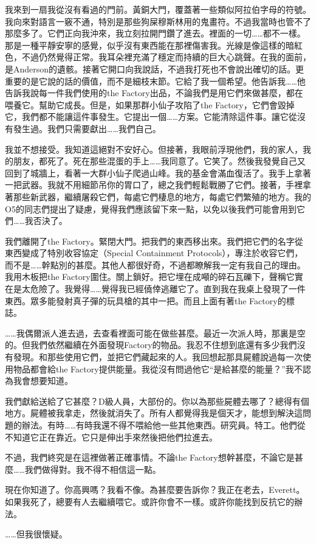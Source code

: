 我來到一扇我從沒有看過的門前。黃銅大門，覆蓋著一些類似阿拉伯字母的符號。我向來對語言一竅不通，特別是那些狗屎穆斯林用的鬼畫符。不過我當時也管不了那麼多了。它們正向我沖來，我立刻拉開門鑽了進去。裡面的一切……都不一樣。那是一種平靜安寧的感覺，似乎沒有東西能在那裡傷害我。光線是像這樣的暗紅色，不過仍然覺得正常。我耳朵裡充滿了穩定而持續的巨大心跳聲。在我的面前，是Anderson的遺骸。接著它開口向我說話，不過我打死也不會說出確切的話。更重要的是它說的話的價值，而不是細枝末節。它給了我一個希望。他告訴我……他告訴我說每一件我們使用的the Factory出品，不論我們是用它們來做甚麼，都在喂養它。幫助它成長。但是，如果那群小仙子攻陷了the Factory，它們會毀掉它，我們都不能讓這件事發生。它提出一個……方案。它能清除這件事。讓它從沒有發生過。我們只需要獻出……我們自己。

我並不想接受。我知道這絕對不安好心。但接著，我眼前浮現他們，我的家人，我的朋友，都死了。死在那些混蛋的手上……我同意了。它笑了。然後我發覺自己又回到了城牆上，看著一大群小仙子爬過山峰。我的基金會滿血復活了。我手上拿著一把武器。我就不用細節吊你的胃口了，總之我們輕鬆戰勝了它們。接著，手裡拿著那些新武器，繼續屠殺它們，每處它們棲息的地方，每處它們繁殖的地方。我的O5的同志們提出了疑慮，覺得我們應該留下來一點，以免以後我們可能會用到它們……我否決了。

我們離開了the Factory。緊閉大門。把我們的東西移出來。我們把它們的名字從東西變成了特別收容協定（Special Containment Protocols），專注於收容它們，而不是……幹點別的甚麼。其他人都很好奇，不過都瞭解我一定有我自己的理由。我用木板把the Factory圍住。關上鎖好。把它埋在成噸的碎石瓦礫下，聲稱它實在是太危險了。我覺得……覺得我已經僥倖逃離它了。直到我在我桌上發現了一件東西。眾多能發射真子彈的玩具槍的其中一把。而且上面有著the Factory的標誌。

……我偶爾派人進去過，去查看裡面可能在做些甚麼。最近一次派人時，那裏是空的。但我們依然繼續在外面發現Factory的物品。我忍不住想到底還有多少我們沒有發現。和那些使用它們，並把它們藏起來的人。我回想起那具屍體說過每一次使用物品都會給the Factory提供能量。我從沒有問過他它“是給甚麼的能量？”我不認為我會想要知道。

我們獻給送給了它甚麼？D級人員，大部份的。你以為那些屍體去哪了？總得有個地方。屍體被我拿走，然後就消失了。所有人都覺得我是個天才，能想到解決這問題的辦法。有時……有時我還不得不喂給他一些其他東西。研究員。特工。他們從不知道它正在靠近。它只是伸出手來然後把他們拉進去。

不過，我們終究是在這裡做著正確事情。不論the Factory想幹甚麼，不論它是甚麼……我們做得對。我不得不相信這一點。

現在你知道了。你高興嗎？我看不像。為甚麼要告訴你？我正在老去，Everett。如果我死了，總要有人去繼續喂它。或許你會不一樣。或許你能找到反抗它的辦法。

……但我很懷疑。
